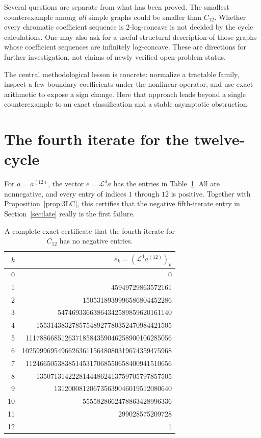 \documentclass[11pt,a4paper]{article}
\theoremstyle{definition}
\newcommand{\Lop}{\mathcal L}
\begin{document}
Several questions are separate from what has been proved. The smallest
counterexample among \emph{all} simple graphs could be smaller than
$C_{12}$. Whether every chromatic coefficient sequence is $2$-log-concave
is not decided by the cycle calculations. One may also ask for a useful
structural description of those graphs whose coefficient sequences are
infinitely log-concave. These are directions for further investigation,
not claims of newly verified open-problem status.

The central methodological lesson is concrete: normalize a tractable
family, inspect a few boundary coefficients under the nonlinear
operator, and use exact arithmetic to expose a sign change. Here that
approach leads beyond a single counterexample to an exact classification
and a stable asymptotic obstruction.

\appendix
\section{The fourth iterate for the twelve-cycle}\label{app:C12}

For $a=a^{(12)}$, the vector $e=\Lop^4a$ has the entries in
Table~\ref{tab:C12}. All are nonnegative, and every entry of indices
$1$ through $12$ is positive. Together with
Proposition~\ref{prop:3LC}, this certifies that the negative fifth-iterate
entry in Section~\ref{sec:late} really is the first failure.

\begin{table}[htbp]
\centering
\small
\begin{tabular}{@{}rr@{}}
\toprule
$k$ & $e_k=(\Lop^4a^{(12)})_k$\\
\midrule
0 & 0\\
1 & 45949729863572161\\
2 & 1505318939996586804452286\\
3 & 54746933663864342589859620161140\\
4 & 15531438327857548927780352470984421505\\
5 & 11178866851263718584359046258900106285056\\
6 & 102599969549662636115648080319674359475968\\
7 & 11246650538385145317068550658400941510656\\
8 & 13507131422281444862413759705797857505\\
9 & 131200081206735639046019512080640\\
10 & 5555828662478863428996336\\
11 & 299028575209728\\
12 & 1\\
\bottomrule
\end{tabular}
\caption{A complete exact certificate that the fourth iterate for
$C_{12}$ has no negative entries.}
\label{tab:C12}
\end{table}
\end{document}
